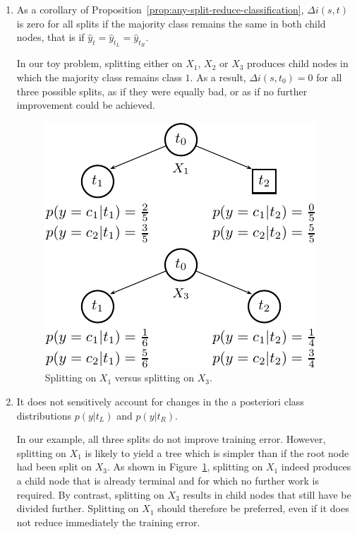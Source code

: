 \begin{enumerate}
\item As a corollary of Proposition~\ref{prop:any-split-reduce-classification},
      $\Delta i(s, t)$ is zero for all splits if the majority class remains
      the same in both child nodes, that is if $\widehat{y}_t = \widehat{y}_{t_L} = \widehat{y}_{t_R}$.

      In our toy problem, splitting either on $X_1$, $X_2$ or $X_3$ produces
      child nodes in which the majority class remains class $1$. As a result,
      $\Delta i(s, t_0) = 0$ for all three possible splits, as if they were
      equally bad, or as if no further improvement could be achieved.

\begin{figure}
    \centering
    \includegraphics[scale=1.0]{figures/ch3_goodness.pdf}
    \caption{Splitting on $X_1$ versus splitting on $X_3$.}
    \label{fig:3:goodness}
\end{figure}

\item It does not sensitively account for changes in the a posteriori class
      distributions $p(y|t_L)$ and $p(y|t_R)$.

      In our example, all three splits do not improve training error. However,
      splitting on $X_1$ is likely to yield a tree which is simpler than if the
      root node had been split on $X_3$.  As shown in
      Figure~\ref{fig:3:goodness}, splitting on $X_1$ indeed produces a child
      node that is already terminal and for which no further work is required.
      By contrast, splitting on $X_3$ results in child nodes that still have be
      divided further.  Splitting on $X_1$ should therefore be preferred, even
      if it does not reduce immediately the training error.
\end{enumerate}


